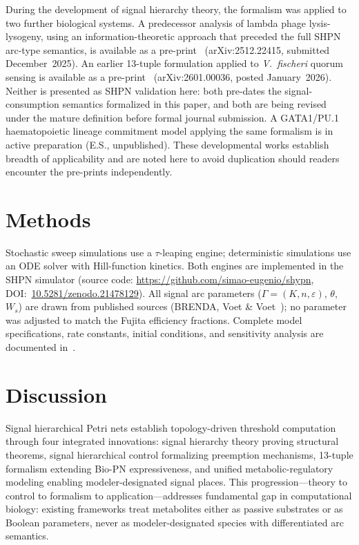 \documentclass[10pt,letterpaper]{article}
\begin{document}
During the development of signal hierarchy theory, the formalism was applied to
two further biological systems. A predecessor analysis of lambda phage
lysis-lysogeny, using an information-theoretic approach that preceded the full
SHPN arc-type semantics, is available as a pre-print~\cite{simao2024hierarchical}
(arXiv:2512.22415, submitted December~2025). An earlier 13-tuple formulation
applied to \textit{V.\ fischeri} quorum sensing is available as a
pre-print~\cite{simao2025unifying} (arXiv:2601.00036, posted January~2026).
Neither is presented as SHPN validation here: both pre-dates the
signal-consumption semantics formalized in this paper, and both are being revised
under the mature definition before formal journal submission. A GATA1/PU.1
haematopoietic lineage commitment model applying the same formalism is in active
preparation (E.S., unpublished). These developmental works establish breadth of
applicability and are noted here to avoid duplication should readers encounter
the pre-prints independently.



\section{Methods}
\label{sec:methods}

Stochastic sweep simulations use a $\tau$-leaping engine; deterministic simulations use an ODE solver with Hill-function kinetics. Both engines are implemented in the SHPN simulator (source code: \url{https://github.com/simao-eugenio/shypn}, DOI:~\href{https://doi.org/10.5281/zenodo.21478129}{10.5281/zenodo.21478129}). All signal arc parameters ($\Gamma = (K, n, \varepsilon)$, $\theta$, $W_s$) are drawn from published sources (BRENDA, Voet \& Voet~\cite{voet2016}); no parameter was adjusted to match the Fujita efficiency fractions. Complete model specifications, rate constants, initial conditions, and sensitivity analysis are documented in~\cite{subtilis2026}.

\section{Discussion}
\label{sec:discussion}

Signal hierarchical Petri nets establish topology-driven threshold computation
through four integrated innovations: signal hierarchy theory proving structural
theorems, signal hierarchical control formalizing preemption mechanisms,
13-tuple formalism extending Bio-PN expressiveness, and unified
metabolic-regulatory modeling enabling modeler-designated signal places.
This progression---theory to control to formalism to application---addresses
fundamental gap in computational biology: existing frameworks treat metabolites
either as passive substrates or as Boolean parameters, never as
modeler-designated species with differentiated arc semantics.
\end{document}
